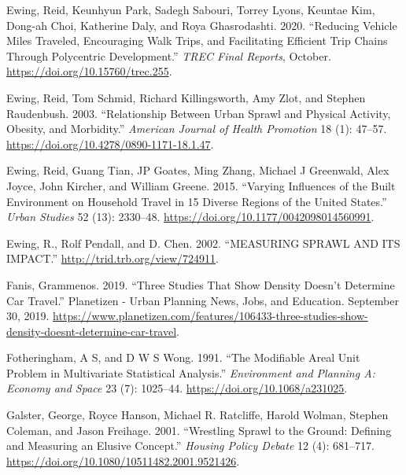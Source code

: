 \documentclass[
  12pt,
]{article}
\newlength{\cslhangindent}
\newlength{\cslentryspacingunit} %
\newenvironment{CSLReferences}[2] %
 {%
  \setlength{\parindent}{0pt}
  \ifodd #1
  \let\oldpar\par
  \def\par{\hangindent=\cslhangindent\oldpar}
  \fi
  \setlength{\parskip}{#2\cslentryspacingunit}
 }%
 {}
\begin{document}
\begin{CSLReferences}{1}{0}
\leavevmode{}%
Ewing, Reid, Keunhyun Park, Sadegh Sabouri, Torrey Lyons, Keuntae Kim, Dong-ah Choi, Katherine Daly, and Roya Ghasrodashti. 2020. {``Reducing {Vehicle Miles Traveled}, {Encouraging Walk Trips}, and {Facilitating Efficient Trip Chains Through Polycentric Development}.''} \emph{TREC Final Reports}, October. \url{https://doi.org/10.15760/trec.255}.

\leavevmode{}%
Ewing, Reid, Tom Schmid, Richard Killingsworth, Amy Zlot, and Stephen Raudenbush. 2003. {``Relationship Between {Urban Sprawl} and {Physical Activity}, {Obesity}, and {Morbidity}.''} \emph{American Journal of Health Promotion} 18 (1): 47--57. \url{https://doi.org/10.4278/0890-1171-18.1.47}.

\leavevmode{}%
Ewing, Reid, Guang Tian, JP Goates, Ming Zhang, Michael J Greenwald, Alex Joyce, John Kircher, and William Greene. 2015. {``Varying Influences of the Built Environment on Household Travel in 15 Diverse Regions of the {United States}.''} \emph{Urban Studies} 52 (13): 2330--48. \url{https://doi.org/10.1177/0042098014560991}.

\leavevmode{}%
Ewing, R., Rolf Pendall, and D. Chen. 2002. {``{MEASURING SPRAWL AND ITS IMPACT}.''} \url{http://trid.trb.org/view/724911}.

\leavevmode{}%
Fanis, Grammenos. 2019. {``Three {Studies That Show Density Doesn}'t {Determine Car Travel}.''} {Planetizen - Urban Planning News, Jobs, and Education}. September 30, 2019. \url{https://www.planetizen.com/features/106433-three-studies-show-density-doesnt-determine-car-travel}.

\leavevmode{}%
Fotheringham, A S, and D W S Wong. 1991. {``The {Modifiable Areal Unit Problem} in {Multivariate Statistical Analysis}.''} \emph{Environment and Planning A: Economy and Space} 23 (7): 1025--44. \url{https://doi.org/10.1068/a231025}.

\leavevmode{}%
Galster, George, Royce Hanson, Michael R. Ratcliffe, Harold Wolman, Stephen Coleman, and Jason Freihage. 2001. {``Wrestling {Sprawl} to the {Ground}: {Defining} and Measuring an Elusive Concept.''} \emph{Housing Policy Debate} 12 (4): 681--717. \url{https://doi.org/10.1080/10511482.2001.9521426}.


\end{CSLReferences}
\end{document}
